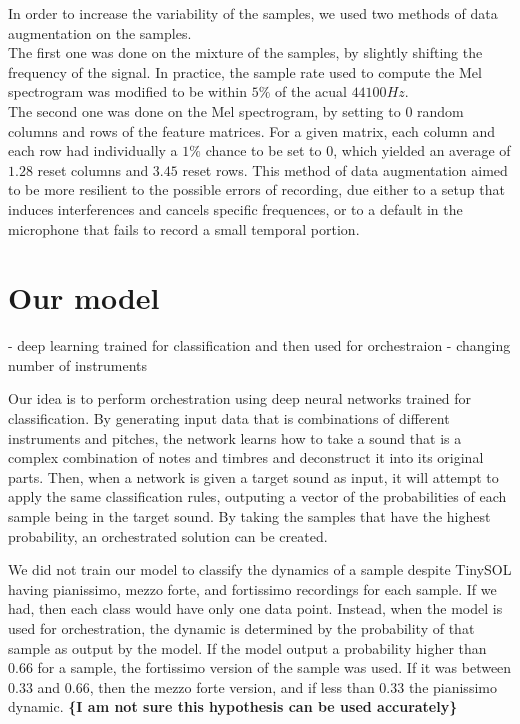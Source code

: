 \documentclass{article}
\begin{document}
In order to increase the variability of the samples, we used two methods of data augmentation on the samples.\\

The first one was done on the mixture of the samples, by slightly shifting the frequency of the signal. In practice, the sample rate used to compute the Mel spectrogram was modified to be within $5\%$ of the acual $44100Hz$.\\

The second one was done on the Mel spectrogram, by setting to 0 random columns and rows of the feature matrices. For a given matrix, each column and each row had individually a $1\%$ chance to be set to 0, which yielded an average of $1.28$ reset columns and $3.45$ reset rows. This method of data augmentation aimed to be more resilient to the possible errors of recording, due either to a setup that induces interferences and cancels specific frequences, or to a default in the microphone that fails to record a small temporal portion.

\section{Our model}
- deep learning trained for classification and then used for orchestraion
- changing number of instruments

Our idea is to perform orchestration using deep neural networks trained for classification. By generating input data that is combinations of different instruments and pitches, the network learns how to take a sound that is a complex combination of notes and timbres and deconstruct it into its original parts. Then, when a network is given a target sound as input, it will attempt to apply the same classification rules, outputing a vector of the probabilities of each sample being in the target sound. By taking the samples that have the highest probability, an orchestrated solution can be created. 

We did not train our model to classify the dynamics of a sample despite TinySOL having pianissimo, mezzo forte, and fortissimo recordings for each sample. If we had, then each class would have only one data point. Instead, when the model is used for orchestration, the dynamic is determined by the probability of that sample as output by the model. If the model output a probability higher than $0.66$ for a sample, the fortissimo version of the sample was used. If it was between $0.33$ and $0.66$, then the mezzo forte version, and if less than $0.33$ the pianissimo dynamic. \textbf{\{I am not sure this hypothesis can be used accurately\}}
\end{document}
